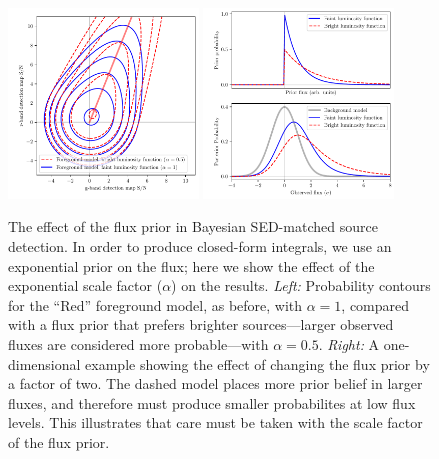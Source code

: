 \documentclass[11pt,letterpaper,linenumbers]{aastex63}
\begin{document}
\begin{figure}
    \begin{center}
    \includegraphics[width=0.45\textwidth]{prob-contours-c}
    \includegraphics[width=0.45\textwidth]{prob-1d}
    \caption{The effect of the flux prior in Bayesian
      SED-matched source detection.  In order to produce closed-form
      integrals, we use an exponential prior on the flux; here
      we show the effect of the exponential scale factor ($\alpha$) on
      the results.  \emph{Left:} Probability contours for the ``Red''
      foreground model, as before, with $\alpha=1$, compared with a flux prior that
      prefers brighter sources---larger observed fluxes are considered
      more probable---with $\alpha=0.5$.  \emph{Right:} A one-dimensional example showing
      the effect of changing the flux prior by a factor of
      two.  The dashed model places more prior belief in larger
      fluxes, and therefore must produce smaller probabilites at low
      flux levels.  This illustrates that care must be taken with the
      scale factor of the flux prior.
      \label{fig:scaling}
    }
    \end{center}
\end{figure}


\end{document}
